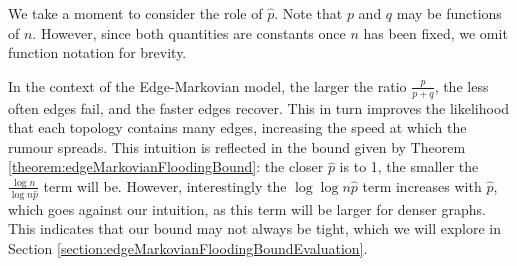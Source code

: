 We take a moment to consider the role of $\hat{p}$. Note that $p$ and $q$ may be functions of $n$. However, since both quantities are constants once $n$ has been fixed, we omit function notation for brevity.

In the context of the Edge-Markovian model, the larger the ratio $\frac{p}{p+q}$, the less often edges fail, and the faster edges recover. %
This in turn improves the likelihood that each topology contains many edges, increasing the speed at which the rumour spreads. This intuition is reflected in the bound given by Theorem \ref{theorem:edgeMarkovianFloodingBound}: the closer $\hat{p}$ is to 1, the smaller the $\frac{\log n}{\log n \hat{p}}$ term will be. However, interestingly the $\log \log n \hat{p}$ term increases with $\hat{p}$, which goes against our intuition, as this term will be larger for denser graphs. 
This indicates that our bound may not always be tight, which we will explore in Section \ref{section:edgeMarkovianFloodingBoundEvaluation}. %


